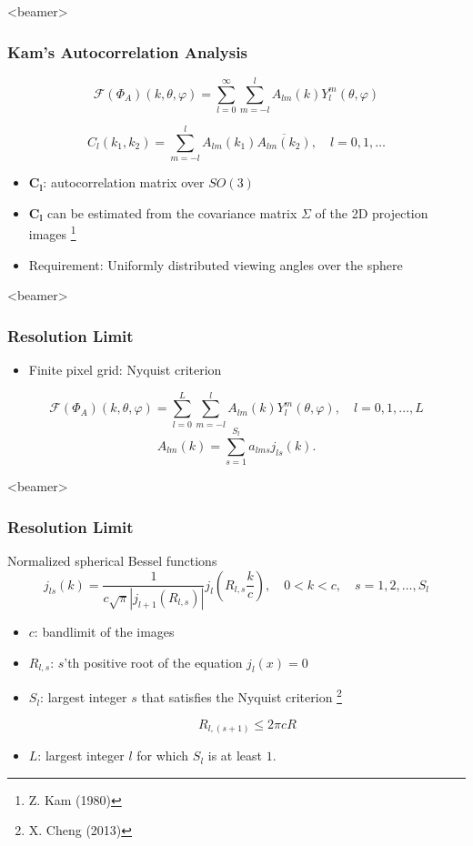 \documentclass{beamer}
\newcommand\blfootnote[1]{%
  \begingroup
  \renewcommand\thefootnote{}\footnote{#1}%
  \addtocounter{footnote}{-1}%
  \endgroup
}
\newcommand{\bl}{\boldsymbol{l}}
\newcommand{\bC}{\boldsymbol{C}}
\def\bl{\boldsymbol{l}}
\begin{document}
\begin{frame}<beamer>
\frametitle{Kam's Autocorrelation Analysis}
\begin{equation*}
\label{eq:phia_expansion_full}
\mathcal{F}(\Phi_A)(k,\theta,\varphi) = \sum_{l=0}^{\infty} \sum_{m=-l}^{l} 
A_{lm}(k)
Y_l^m
(\theta, \varphi) \nonumber
\end{equation*}

\begin{equation*}
\label{eq:Cl}
C_{{l}}(k_1,k_2) = \sum_{m=-l}^l A_{lm}(k_1)\overline{A_{lm}(k_2)}, \quad 
l=0,1,\ldots \nonumber
\end{equation*}

\begin{itemize}
\item $\bC_{\bl}$: autocorrelation matrix over $SO(3)$
\item $\bC_{\bl}$ can be estimated from the covariance matrix $\Sigma$ of the 2D projection images \blfootnote{Z. Kam (1980)}
\item Requirement: Uniformly distributed viewing angles over the sphere
\end{itemize}
\end{frame}

\begin{frame}<beamer>
\frametitle{Resolution Limit}
\begin{itemize}
\item Finite pixel grid: Nyquist criterion
\end{itemize}
\begin{equation*}\label{eq:phia_expansion}
\mathcal{F}(\Phi_A)(k,\theta,\varphi) = \sum_{l=0}^{L} \sum_{m=-l}^{l} A_{lm}(k)
Y_l^m
(\theta, \varphi), \quad l=0, 1,\ldots, L \nonumber
\end{equation*}
\begin{equation*}
\label{Alm_practice}
A_{lm}(k)= \sum_{s=1}^{S_l} a _{lms}j_{ls}(k).
\end{equation*}
\end{frame}


\begin{frame}<beamer>
\frametitle{Resolution Limit}
Normalized spherical Bessel functions
\begin{equation*}
\label{j_ls}
j_{ls}(k)= \frac{1}{c\sqrt{\pi}|j_{l+1}(R_{l,s})|} j_l(R_{l,s}\frac{k}{c}), \quad 0<k<c, 
\quad s=1,2,\ldots,S_l \nonumber
\end{equation*}
\begin{itemize}
\item $c$: bandlimit of the images
\item $R_{l,s}$: $s$'th positive root of the equation $j_l(x)=0$
\item $S_l$: largest integer $s$ that satisfies the Nyquist criterion \blfootnote{X. Cheng (2013)}
\begin{equation*}
\label{eq:nyq_sampling}
R_{l,(s+1)}\leq 2\pi cR \nonumber
\end{equation*}
\item $L$: largest integer $l$ for which $S_l$ is at least $1$.
\end{itemize}
\end{frame}
\end{document}
